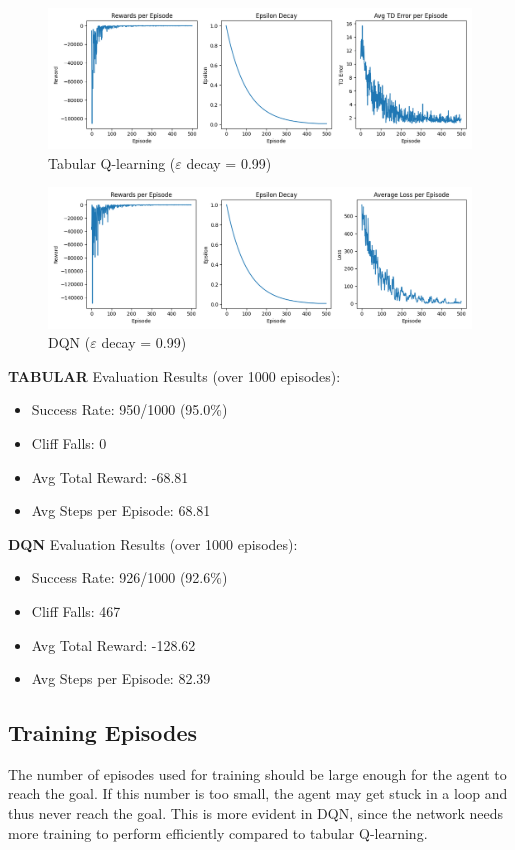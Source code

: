 \documentclass[a4paper,12pt]{article}
\begin{document}
\begin{figure}[H]
    \centering
    \includegraphics[width=\linewidth]{1_32_099_64_slip_tab.png}
    \caption{Tabular Q-learning ($\varepsilon$ decay = 0.99)}
\end{figure}
\begin{figure}[H]
    \centering
    \includegraphics[width=\linewidth]{1_32_099_64_slip_dqn.png}
    \caption{DQN ($\varepsilon$ decay = 0.99)}
\end{figure}
\noindent \textbf{TABULAR} Evaluation Results (over 1000 episodes):
\begin{itemize}
    \item Success Rate: 950/1000 (95.0\%)
    \item Cliff Falls: 0
    \item Avg Total Reward: -68.81
    \item Avg Steps per Episode: 68.81
\end{itemize}
\textbf{DQN} Evaluation Results (over 1000 episodes):
\begin{itemize}
    \item Success Rate: 926/1000 (92.6\%)
    \item Cliff Falls: 467
    \item Avg Total Reward: -128.62
    \item Avg Steps per Episode: 82.39
\end{itemize}



\subsection{Training Episodes}
The number of episodes used for training should be large enough for the agent to reach the goal. If this number is too small, the agent may get stuck in a loop and thus never reach the goal. This is more evident in DQN, since the network needs more training to perform efficiently compared to tabular Q-learning.\\
\end{document}
